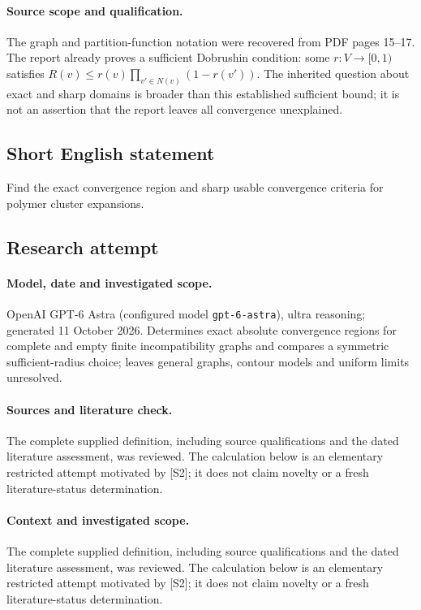 \documentclass[11pt]{article}
\begin{document}
\paragraph{Source scope and qualification.}
The graph and partition-function notation were recovered from PDF pages 15--17. The report already proves a sufficient Dobrushin condition: some $r:V\to[0,1)$ satisfies $R(v)\leq r(v)\prod_{v'\in N(v)}(1-r(v'))$. The inherited question about exact and sharp domains is broader than this established sufficient bound; it is not an assertion that the report leaves all convergence unexplained.
\subsection{Short English statement}
Find the exact convergence region and sharp usable convergence criteria for polymer cluster expansions.
\subsection{Research attempt}
\paragraph{Model, date and investigated scope.}
OpenAI GPT-6 Astra (configured model \texttt{gpt-6-astra}), ultra reasoning; generated 11 October 2026. Determines exact absolute convergence regions for complete and empty finite incompatibility graphs and compares a symmetric sufficient-radius choice; leaves general graphs, contour models and uniform limits unresolved.

\paragraph{Sources and literature check.}
The complete supplied definition, including source qualifications and the dated literature assessment, was reviewed. The calculation below is an elementary restricted attempt motivated by [S2]; it does not claim novelty or a fresh literature-status determination.

\paragraph{Context and investigated scope.} The complete supplied definition, including source qualifications and the dated literature assessment, was reviewed. The calculation below is an elementary restricted attempt motivated by [S2]; it does not claim novelty or a fresh literature-status determination.
\end{document}

